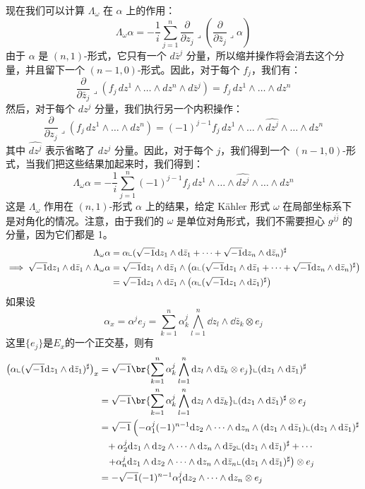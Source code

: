 现在我们可以计算 \(\Lambda_\omega\) 在 \(\alpha\) 上的作用：
\[
\Lambda_\omega \alpha = -\frac{1}{i} \sum_{j=1}^{n} \frac{\partial}{\partial z_j} \lrcorner \left( \frac{\partial}{\partial \bar{z}_j} \lrcorner \alpha \right)
\]
由于 \(\alpha\) 是 \((n,1)\)-形式，它只有一个 \(d\bar{z}^j\) 分量，所以缩并操作将会消去这个分量，并且留下一个 \((n-1,0)\)-形式。因此，对于每个 \(f_j\)，我们有：
\[
\frac{\partial}{\partial \bar{z}_j} \lrcorner (f_j \, dz^1 \wedge \ldots \wedge dz^n \wedge d\bar{z}^j) = f_j \, dz^1 \wedge \ldots \wedge dz^n
\]
然后，对于每个 \(dz^j\) 分量，我们执行另一个内积操作：
\[
\frac{\partial}{\partial z_j} \lrcorner (f_j \, dz^1 \wedge \ldots \wedge dz^n) = (-1)^{j-1} f_j \, dz^1 \wedge \ldots \wedge \widehat{dz^j} \wedge \ldots \wedge dz^n
\]
其中 \(\widehat{dz^j}\) 表示省略了 \(dz^j\) 分量。因此，对于每个 \(j\)，我们得到一个 \((n-1,0)\)-形式，当我们把这些结果加起来时，我们得到：
\[
\Lambda_\omega \alpha = -\frac{1}{i} \sum_{j=1}^{n} (-1)^{j-1} f_j \, dz^1 \wedge \ldots \wedge \widehat{dz^j} \wedge \ldots \wedge dz^n
\]
这是 \(\Lambda_\omega\) 作用在 \((n, 1)\)-形式 \(\alpha\) 上的结果，给定 Kähler 形式 \(\omega\) 在局部坐标系下是对角化的情况。注意，由于我们的 \(\omega\) 是单位对角形式，我们不需要担心 \(g^{j\bar{j}}\) 的分量，因为它们都是 1。
\begin{align*}
  \Lambda_\omega \alpha &=\alpha\llcorner (\sqrt{-1} \dd z_1\wedge\dd \bar{z}_1+\cdots+\sqrt{-1} \dd z_n\wedge\dd \bar{z}_n)^\sharp \\ 
\implies \sqrt{-1} \dd z_1\wedge\dd \bar{z}_1\wedge \Lambda_\omega \alpha &=\sqrt{-1} \dd z_1\wedge\dd \bar{z}_1\wedge \left(\alpha\llcorner (\sqrt{-1} \dd z_1\wedge\dd \bar{z}_1+\cdots+\sqrt{-1} \dd z_n\wedge\dd \bar{z}_n)^\sharp\right)\\ 
&=\sqrt{-1} \dd z_1\wedge\dd \bar{z}_1\wedge \left(\alpha\llcorner (\sqrt{-1} \dd z_1\wedge\dd \bar{z}_1)^\sharp\right)
\end{align*}
  如果设 
  \[
    \alpha_x=\alpha^j e_j=\sum_{k=1}^{n} \alpha_k^j \bigwedge_{l=1}^n \dd z_l\wedge \dd \bar{z}_k\otimes e_j
  \]
  这里$\{e_j\}$是$E_x$的一个正交基，则有
  \begin{align*}
    \left(\alpha\llcorner (\xu \dd z_1\wedge\dd \bar{z}_1)^\sharp\right)_x &=\xu \br{\sum_{k=1}^{n} \alpha_k^j \bigwedge_{l=1}^n \dd z_l\wedge \dd \bar{z}_k\otimes e_j} \llcorner (\dd z_1\wedge\dd \bar{z}_1)^\sharp\\ 
&=\xu \br{\sum_{k=1}^{n} \alpha_k^j \bigwedge_{l=1}^n \dd z_l\wedge \dd \bar{z}_k} \llcorner (\dd z_1\wedge\dd \bar{z}_1)^\sharp \otimes e_j\\ 
&=\xu \left(-\alpha_1^j (-1)^{n-1}\dd z_2\wedge \cdots\wedge\dd z_n\wedge (\dd z_1\wedge\dd \bar{z}_1)\llcorner (\dd z_1\wedge\dd \bar{z}_1)^\sharp \right.\\
&\phantom{=}+\alpha_2^j \dd z_1\wedge\dd z_2\wedge \cdots\wedge\dd z_n\wedge\dd \bar{z}_2\llcorner (\dd z_1\wedge\dd \bar{z}_1)^\sharp+\cdots\\
&\phantom{=}\left.+\alpha_n^j \dd z_1\wedge\dd z_2\wedge \cdots\wedge\dd z_n\wedge\dd \bar{z}_n\llcorner (\dd z_1\wedge\dd \bar{z}_1)^\sharp\right)\otimes e_j\\ 
&=-\xu (-1)^{n-1}\alpha_1^j \dd z_2\wedge \cdots\wedge\dd z_n \otimes e_j
  \end{align*}
